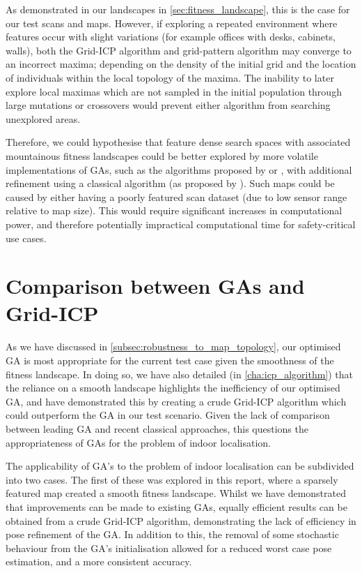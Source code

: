 \documentclass[authoryearcitations]{UoYCSproject}
\begin{document}
As demonstrated in our landscapes in \autoref{sec:fitness_landscape}, this is the case for our test scans and maps. However, if exploring a repeated environment where features occur with slight variations (for example offices with desks, cabinets, walls), both the Grid-ICP algorithm and grid-pattern algorithm may converge to an incorrect maxima; depending on the density of the initial grid and the location of individuals within the local topology of the maxima. The inability to later explore local maximas which are not sampled in the initial population through large mutations or crossovers would prevent either algorithm from searching unexplored areas. \newline

Therefore, we could hypothesise that feature dense search spaces with associated mountainous fitness landscapes could be better explored by more volatile implementations of GAs, such as the algorithms proposed by \citet{Robertson2002-ou} or \citet{Lenac2007-xm}, with additional refinement using a classical algorithm (as proposed by \citet{Lenac2011-co}). Such maps could be caused by either having a poorly featured scan dataset (due to low sensor range relative to map size). This would require significant increases in computational power, and therefore potentially impractical computational time for safety-critical use cases.

\section{Comparison between GAs and Grid-ICP}

As we have discussed in \autoref{subsec:robustness_to_map_topology}, our optimised GA is most appropriate for the current test case given the smoothness of the fitness landscape. In doing so, we have also detailed (in \autoref{cha:icp_algorithm}) that the reliance on a smooth landscape highlights the inefficiency of our optimised GA, and have demonstrated this by creating a crude Grid-ICP algorithm which could outperform the GA in our test scenario. Given the lack of comparison between leading GA and recent classical approaches, this questions the appropriateness of GAs for the problem of indoor localisation. \newline

The applicability of GA's to the problem of indoor localisation can be subdivided into two cases. The first of these was explored in this report, where a sparsely featured map created a smooth fitness landscape. Whilst we have demonstrated that improvements can be made to existing GAs, equally efficient results can be obtained from a crude Grid-ICP algorithm, demonstrating the lack of efficiency in pose refinement of the GA. In addition to this, the removal of some stochastic behaviour from the GA's initialisation allowed for a reduced worst case pose estimation, and a more consistent accuracy.  \newline
\end{document}
